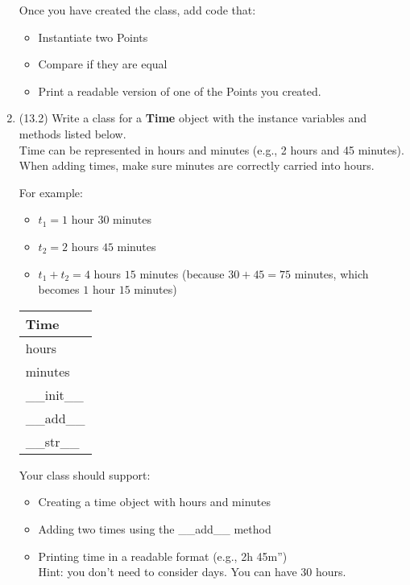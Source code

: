 \documentclass{article}
\newcommand{\csq}[1]{\reflectbox{''}#1''}  %
\begin{document}
\begin{enumerate}
		Once you have created the class, add code that:
		\begin{itemize}
			\item Instantiate two Points
			\item Compare if they are equal
			\item Print a readable version of one of the Points you created.
		\end{itemize}




\item (13.2)
		Write a class for a \textbf{Time} object with the instance variables and methods listed 
		below.\\
		Time can be represented in hours and minutes (e.g., 2 hours and 45 minutes). \\
		When adding times, make sure minutes are correctly carried into hours.

		\begin{minipage}[t]{0.65\textwidth}
			For example:
			\begin{itemize}
				\item $t_1 = 1$ hour $30$ minutes
				\item $t_2 = 2$ hours $45$ minutes
				\item $t_1 + t_2 = 4$ hours $15$ minutes 
					(because $30 + 45 = 75$ minutes, which becomes $1$ hour $15$ minutes)
			\end{itemize}

		\end{minipage}
		\hfill
		\begin{minipage}[t]{0.32\textwidth}
			\vspace{.2em}
			\begin{flushright}
				\begin{tabular}{|l|}
					\hline
					Time \\ \hline
					hours \\
					minutes \\ \hline
					\_\_init\_\_ \\
					\_\_add\_\_ \\
					\_\_str\_\_ \\ \hline
				\end{tabular}
			\end{flushright}
		\end{minipage}
		
		Your class should support:
		\begin{itemize}
			\item Creating a time object with hours and minutes
			\item Adding two times using the \_\_add\_\_ method 
			\item Printing time in a readable format (e.g., \csq{2h 45m})\\
				Hint: you don't need to consider days. You can have 30 hours.
		\end{itemize}


\end{enumerate}
\end{document}

